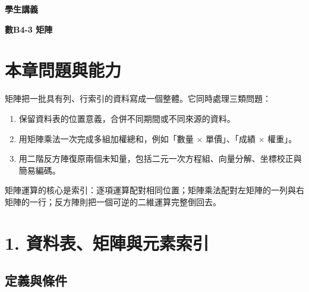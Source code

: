 \documentclass[11pt,a4paper]{article}
\providecommand{\tightlist}{%
  \setlength{\itemsep}{0pt}\setlength{\parskip}{0pt}}
\begin{document}
\begin{tcolorbox}[
  enhanced,colback=white,colframe=HandoutBlue,boxrule=1.1pt,arc=2mm,
  borderline west={3pt}{0pt}{HandoutBlue},left=5mm,right=4mm,top=4mm,bottom=4mm
]
{\sffamily\small\bfseries\color{HandoutBlue}學生講義}\par
{\sffamily\bfseries\LARGE\color{HandoutInk}數B4-3 矩陣}\par
\vspace{0.35em}{\large 從資料表的索引與運算，到二元方程組、向量分解與資訊復原}\par
{}\par
{}\par
\end{tcolorbox}


\section{本章問題與能力}\label{ux672cux7ae0ux554fux984cux8207ux80fdux529b}

矩陣把一批具有列、行索引的資料寫成一個整體。它同時處理三類問題：

\begin{enumerate}
\def\labelenumi{\arabic{enumi}.}
\tightlist
\item
  保留資料表的位置意義，合併不同期間或不同來源的資料。
\item
  用矩陣乘法一次完成多組加權總和，例如「數量 × 單價」、「成績 × 權重」。
\item
  用二階反方陣復原兩個未知量，包括二元一次方程組、向量分解、坐標校正與簡易編碼。
\end{enumerate}

矩陣運算的核心是索引：逐項運算配對相同位置；矩陣乘法配對左矩陣的一列與右矩陣的一行；反方陣則把一個可逆的二維運算完整倒回去。

\section{1. 資料表、矩陣與元素索引}\label{ux8cc7ux6599ux8868ux77e9ux9663ux8207ux5143ux7d20ux7d22ux5f15}

\subsection{定義與條件}\label{ux5b9aux7fa9ux8207ux689dux4ef6}
\end{document}
